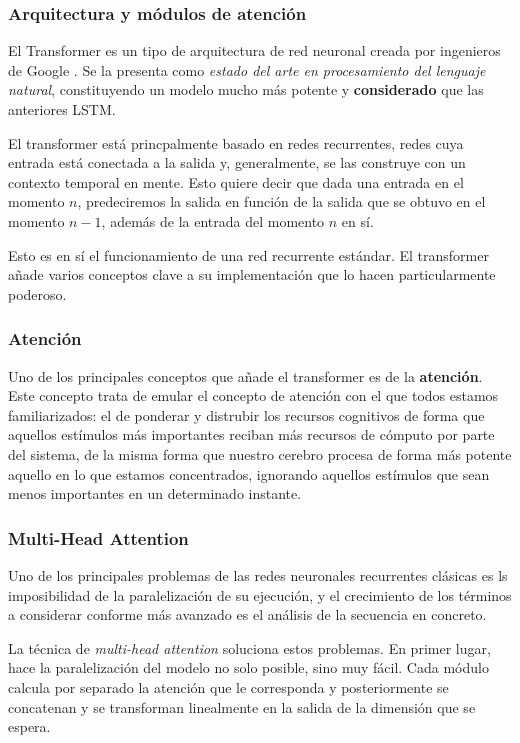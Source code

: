 \subsubsection{Arquitectura y módulos de atención}
El Transformer es un tipo de arquitectura de red neuronal creada por ingenieros de Google \cite{TransformerAshish2017}. Se la presenta como \textit{estado del arte en procesamiento del lenguaje natural}, constituyendo un modelo mucho más potente y \textbf{considerado} que las anteriores LSTM.

El transformer está princpalmente basado en redes recurrentes, redes cuya entrada está conectada a la salida y, generalmente, se las construye con un contexto temporal en mente. Esto quiere decir que dada una entrada en el momento $n$, predeciremos la salida en función de la salida que se obtuvo en el momento $n - 1$, además de la entrada del momento $n$ en sí.

Esto es en sí el funcionamiento de una red recurrente estándar. El transformer añade varios conceptos clave a su implementación que lo hacen particularmente poderoso.

\subsubsection{Atención}
Uno de los principales conceptos que añade el transformer es de la \textbf{atención}. Este concepto trata de emular el concepto de atención con el que todos estamos familiarizados: el de ponderar y distrubir los recursos cognitivos de forma que aquellos estímulos más importantes reciban más recursos de cómputo por parte del sistema, de la misma forma que nuestro cerebro procesa de forma más potente aquello en lo que estamos concentrados, ignorando aquellos estímulos que sean menos importantes en un determinado instante.

\subsubsection{Multi-Head Attention}
Uno de los principales problemas de las redes neuronales recurrentes clásicas es ls imposibilidad de la paralelización de su ejecución, y el crecimiento de los términos a considerar conforme más avanzado es el análisis de la secuencia en concreto.

La técnica de \textit{multi-head attention} soluciona estos problemas. En primer lugar, hace la paralelización del modelo no solo posible, sino muy fácil. Cada módulo calcula por separado la atención que le corresponda y posteriormente se concatenan y se transforman linealmente en la salida de la dimensión que se espera. 

